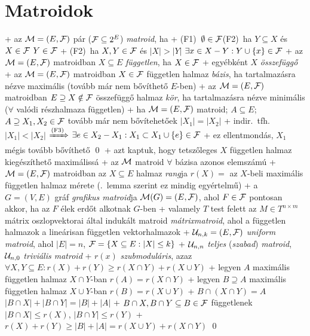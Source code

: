 \section{Matroidok}


+ \dfn az $\mathcal{M} = (E, \mathcal{F})$ pár ($\mathcal{F} \subseteq 2^E$) \emph{matroid},
  ha
  + (F1)~$\emptyset \in \mathcal{F}$\qquad(F2)~ha $Y \subseteq X$ és $X \in
    \mathcal{F}$ \RA $Y \in \mathcal{F}$
  + (F2)~ha $X, Y \in \mathcal{F}$ és $\lvert X \rvert > \lvert Y \rvert$ \RA
    $\exists x \in X - Y : Y \cup \{ x \} \in \mathcal{F}$
+ \dfn az $\mathcal{M} = (E, \mathcal{F})$ matroidban $X \subseteq E$
  \emph{független}, ha $X \in \mathcal{F}$
  + egyébként $X$ \emph{összefüggő}
+ \dfn az $\mathcal{M} = (E, \mathcal{F})$ matroidban $X \in \mathcal{F}$ független
  halmaz \emph{bázis}, ha tartalmazásra nézve maximális (tovább már
  nem bővíthető $E$-ben)
+ \dfn az $\mathcal{M} = (E, \mathcal{F})$ matroidban $E \supseteq X \notin \mathcal{F}$
  összefüggő halmaz \emph{kör}, ha tartalmazásra nézve minimális
  ($\forall$ valódi részhalmaza független)
+ \lemma \label{lem:matroid:def:meret}ha $\mathcal{M} = (E, \mathcal{F})$ matroid; $A
  \subseteq E$; $A \supseteq X_1, X_2 \in \mathcal{F}$ tovább már nem
  bővítehetőek \RA $\lvert X_1 \rvert = \lvert X_2 \rvert$
  + \proof indir.~tfh.~$\lvert X_1 \rvert < \lvert X_2 \rvert$
    $\xRightarrow{\text{(F3)}}$ $\exists e \in X_2 - X_1 : X_1
    \subset X_1 \cup \{ e \} \in \mathcal{F}$
  + ez ellentmondás, $X_1$ mégis tovább bővíthető \qed
  + azt kaptuk, hogy tetszőleges $X$ független halmaz kiegészíthető
    maximálissá
+ \corr az $\mathcal{M}$ matroid $\forall$ bázisa azonos elemszámú
+ \dfn $\mathcal{M} = (E, \mathcal{F})$ matroidban az $X \subseteq E$ halmaz
  \emph{rang}ja $r(X) =$ az $X$-beli maximális független halmaz mérete
  (.~lemma szerint ez mindig egyértelmű)
+ \example  a $G = (V, E)$ gráf \emph{grafikus matroid}ja $\mathcal{M}(G) =
  (E, \mathcal{F})$, ahol $F \in \mathcal{F}$ pontosan akkor, ha az $F$ élek erdőt
  alkotnak $G$-ben
+ \example valamely $T$ test felett az $M \in T^{n \times m}$ mátrix
  oszlopvektorai által indukált matroid \emph{mátrixmatroid}, ahol
  a független halmazok a lineárisan független vektorhalmazok
+ $\mathcal{U}_{n, k} = (E, \mathcal{F})$ \emph{uniform matroid}, ahol $\lvert E
  \rvert = n$, $\mathcal{F} = \{ X \subseteq E : \lvert X \rvert \le k \}$
  + $\mathcal{U}_{n, n}$ \emph{teljes} (\emph{szabad}) \emph{matroid},
    $\mathcal{U}_{n, 0}$ \emph{triviális matroid}
+ \thm \label{thm:matroid:def:submod}$r(x)$ \emph{szubmoduláris}, azaz
  $\forall X, Y \subseteq E: r(X) + r(Y) \ge r(X \cap Y) + r(X \cup Y)$
  + \proof legyen $A$ maximális független halmaz $X \cap Y$-ban
    \RA $r(A) = r(X \cap Y)$
  + legyen $B \supseteq A$ maximális független halmaz $X \cup Y$-ban
    \RA $r(B) = r(X \cup Y)$
  + $B \cap (X \cap Y) = A$ \RA $\lvert B \cap X \rvert + \lvert B
    \cap Y \rvert = \lvert B \rvert + \lvert A \rvert$
  + $B \cap X, B \cap Y \subseteq B \in \mathcal{F}$ függetlenek \RA%
    $\lvert B \cap X \rvert \le r(X)$, $\lvert B \cap Y \rvert \le
    r(Y)$
  + $r(X) + r(Y) \ge \lvert B \rvert + \lvert A \rvert = r(X \cup Y) +
    r(X \cap Y)$ \qed

